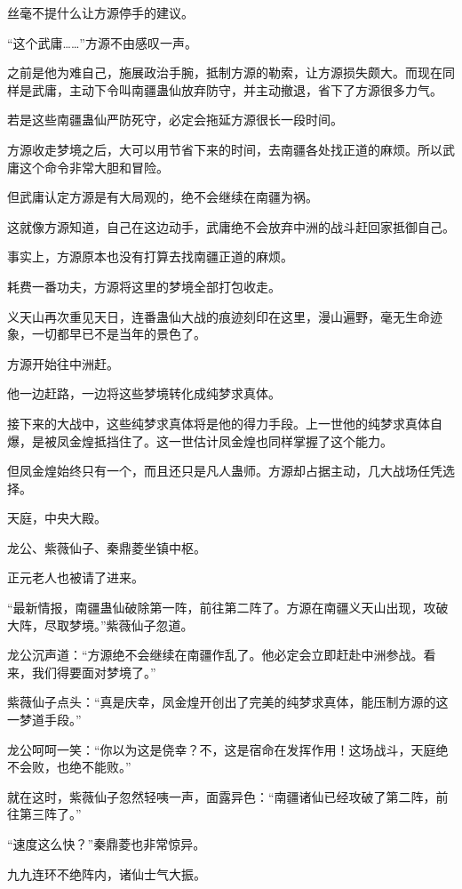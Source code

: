 \begin{this_body}
丝毫不提什么让方源停手的建议。

“这个武庸……”方源不由感叹一声。

之前是他为难自己，施展政治手腕，抵制方源的勒索，让方源损失颇大。而现在同样是武庸，主动下令叫南疆蛊仙放弃防守，并主动撤退，省下了方源很多力气。

若是这些南疆蛊仙严防死守，必定会拖延方源很长一段时间。

方源收走梦境之后，大可以用节省下来的时间，去南疆各处找正道的麻烦。所以武庸这个命令非常大胆和冒险。

但武庸认定方源是有大局观的，绝不会继续在南疆为祸。

这就像方源知道，自己在这边动手，武庸绝不会放弃中洲的战斗赶回家抵御自己。

事实上，方源原本也没有打算去找南疆正道的麻烦。

耗费一番功夫，方源将这里的梦境全部打包收走。

义天山再次重见天日，连番蛊仙大战的痕迹刻印在这里，漫山遍野，毫无生命迹象，一切都早已不是当年的景色了。

方源开始往中洲赶。

他一边赶路，一边将这些梦境转化成纯梦求真体。

接下来的大战中，这些纯梦求真体将是他的得力手段。上一世他的纯梦求真体自爆，是被凤金煌抵挡住了。这一世估计凤金煌也同样掌握了这个能力。

但凤金煌始终只有一个，而且还只是凡人蛊师。方源却占据主动，几大战场任凭选择。

天庭，中央大殿。

龙公、紫薇仙子、秦鼎菱坐镇中枢。

正元老人也被请了进来。

“最新情报，南疆蛊仙破除第一阵，前往第二阵了。方源在南疆义天山出现，攻破大阵，尽取梦境。”紫薇仙子忽道。

龙公沉声道：“方源绝不会继续在南疆作乱了。他必定会立即赶赴中洲参战。看来，我们得要面对梦境了。”

紫薇仙子点头：“真是庆幸，凤金煌开创出了完美的纯梦求真体，能压制方源的这一梦道手段。”

龙公呵呵一笑：“你以为这是侥幸？不，这是宿命在发挥作用！这场战斗，天庭绝不会败，也绝不能败。”

就在这时，紫薇仙子忽然轻咦一声，面露异色：“南疆诸仙已经攻破了第二阵，前往第三阵了。”

“速度这么快？”秦鼎菱也非常惊异。

九九连环不绝阵内，诸仙士气大振。


\end{this_body}
